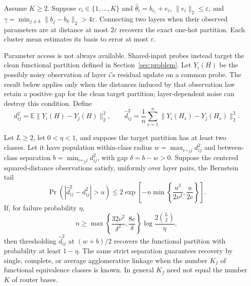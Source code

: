 \begin{theorem}
\label{thm:noisy_recovery}
Assume $K\ge2$.  Suppose $c_i\in\{1,\ldots,K\}$ and
$\widehat\theta_i=b_{c_i}+e_i$, $\|e_i\|_2\le\varepsilon$, and
$\gamma=\min_{j\ne k}\|b_j-b_k\|_2>4\varepsilon$.  Connecting two layers
when their observed parameters are at distance at most $2\varepsilon$
recovers the exact one-hot partition.  Each cluster mean estimates its basis
to error at most $\varepsilon$.
\end{theorem}

Parameter access is not always available.  Shared-input probes instead target
the clean functional partition defined in Section~\ref{sec:problem}.  Let
$Y_i(H)$ be the possibly noisy observation of layer $i$'s residual update on
a common probe.  The result below applies only when the distances induced by
that observation law retain a positive gap for the clean target partition;
layer-dependent noise can destroy this condition.  Define
\begin{equation}
 d_{ij}^2=\mathbb E\|Y_i(H)-Y_j(H)\|_2^2,\qquad
 \widehat d_{ij}^2=\frac1n\sum_{s=1}^n
 \|Y_i(H_s)-Y_j(H_s)\|_2^2.
 \label{eq:probe_distances}
\end{equation}

\begin{theorem}
\label{thm:probe_recovery}
Let $L\ge2$, let $0<\eta<1$, and suppose the target partition has at least
two classes. Let it have population within-class radius
$w=\max_{i\sim_f j}d_{ij}^2$ and between-class separation
$b=\min_{i\not\sim_f j}d_{ij}^2$, with gap $\delta=b-w>0$.  Suppose the
centered squared-distance observations satisfy, uniformly over layer pairs,
the Bernstein tail
\begin{equation}
 \Pr\!\left(\left|\widehat d_{ij}^2-d_{ij}^2\right|>u\right)
 \le2\exp\!\left[-n\min\!\left\{\frac{u^2}{2\nu^2},
                                      \frac{u}{2c}\right\}\right].
 \label{eq:probe_bernstein}
\end{equation}
If, for failure probability $\eta$,
\begin{equation}
 n\ge
 \max\!\left\{\frac{32\nu^2}{\delta^2},\frac{8c}{\delta}\right\}
 \log\frac{2\binom{L}{2}}{\eta},
 \label{eq:probe_sample_complexity}
\end{equation}
then thresholding $\widehat d_{ij}^2$ at $(w+b)/2$ recovers the functional
partition with probability at least $1-\eta$.  The same strict separation
guarantees recovery by single, complete, or average agglomerative linkage when
the number $K_f$ of functional equivalence classes is known.  In general
$K_f$ need not equal the number $K$ of router bases.
\end{theorem}

